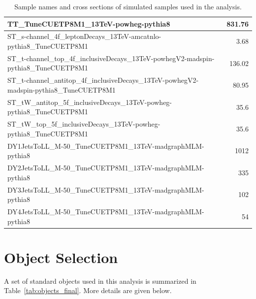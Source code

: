 \begin{table}[!htbp]
{\begin{tabular}{lr}
\hline
TT\_{}TuneCUETP8M1\_{}13TeV-powheg-pythia8 & 831.76 \\
\hline
ST\_{}s-channel\_{}4f\_{}leptonDecays\_{}13TeV-amcatnlo-pythia8\_{}TuneCUETP8M1 & 3.68 \\
ST\_{}t-channel\_{}top\_{}4f\_{}inclusiveDecays\_{}13TeV-powhegV2-madspin-pythia8\_{}TuneCUETP8M1 & 136.02 \\
ST\_{}t-channel\_{}antitop\_{}4f\_{}inclusiveDecays\_{}13TeV-powhegV2-madspin-pythia8\_{}TuneCUETP8M1 & 80.95 \\
ST\_{}tW\_{}antitop\_{}5f\_{}inclusiveDecays\_{}13TeV-powheg-pythia8\_{}TuneCUETP8M1 & 35.6 \\
ST\_{}tW\_{}top\_{}5f\_{}inclusiveDecays\_{}13TeV-powheg-pythia8\_{}TuneCUETP8M1 & 35.6 \\
\hline
DY1JetsToLL\_M-50\_TuneCUETP8M1\_13TeV-madgraphMLM-pythia8 & 1012 \\
DY2JetsToLL\_M-50\_TuneCUETP8M1\_13TeV-madgraphMLM-pythia8 & 335 \\
DY3JetsToLL\_M-50\_TuneCUETP8M1\_13TeV-madgraphMLM-pythia8 & 102 \\
DY4JetsToLL\_M-50\_TuneCUETP8M1\_13TeV-madgraphMLM-pythia8 & 54 \\
\end{tabular}
}
\caption{Sample names and cross sections of simulated samples used in the analysis.}
\label{tab:bkgSamples}
\end{table}


\section{Object Selection} %
\label{sec:object_selection}
A set of standard objects used in this analysis is summarized in Table~\ref{tab:objects_final}. More details are given below.  

